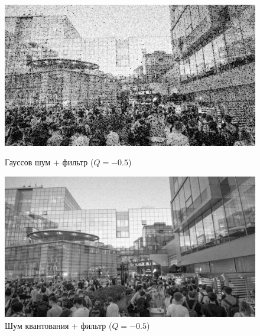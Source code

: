 \documentclass[a4paper]{article}
\begin{document}
\begin{figure}[H]
    \begin{minipage}{0.49\textwidth}
        \centering \includegraphics[width=\textwidth]{images/2_low_filters/gaussian - contrharmonic (Q=-0.5).jpg}
        \caption{Гауссов шум + фильтр ($Q = -0.5$)}
    \end{minipage}\hfill
    \begin{minipage}{0.49\textwidth}
        \centering \includegraphics[width=\textwidth]{images/2_low_filters/poisson - contrharmonic (Q=-0.5).jpg}
        \caption{Шум квантования + фильтр ($Q = -0.5$)}
    \end{minipage}
\end{figure}
\end{document}
